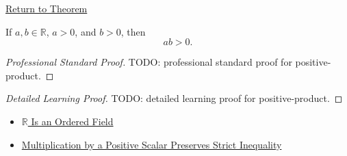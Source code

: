 \newpage
{}
\label{prf:positive-product}

\begin{remark*}[Return]
\hyperref[lem:positive-product]{Return to Theorem}
\end{remark*}

\begin{lemma*}
If $a,b\in\mathbb{R}$, $a>0$, and $b>0$, then
\[
ab>0.
\]
\end{lemma*}

\begin{proof}[Professional Standard Proof]
\LRAProofBodyStart
TODO: professional standard proof for positive-product.
\end{proof}

\begin{proof}[Detailed Learning Proof]
\LRAProofBodyStart
TODO: detailed learning proof for positive-product.
\end{proof}

\begin{remark*}
\end{remark*}

\begin{dependencies}
\begin{itemize}
  \item \hyperref[thm:r-is-an-ordered-field]{$\mathbb{R}$ Is an Ordered Field}
  \item \hyperref[thm:ineq-multiply-positive]{Multiplication by a Positive Scalar Preserves Strict Inequality}
\end{itemize}
\end{dependencies}

\clearpage
